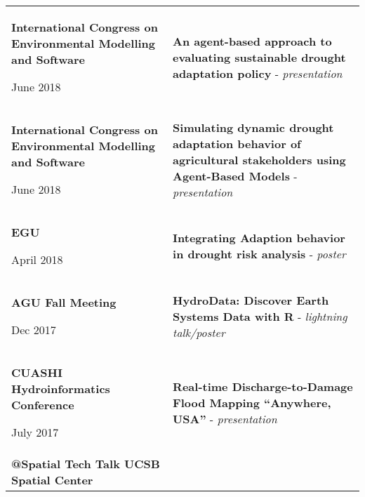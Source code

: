 \begin{longtable}[]{@{}ll@{}}

\endhead
\begin{minipage}[t]{0.47\columnwidth}\raggedright
\textbf{International Congress on Environmental Modelling and Software}

June 2018\strut
\end{minipage} & \begin{minipage}[t]{0.47\columnwidth}\raggedright
\textbf{An agent-based approach to evaluating sustainable drought
adaptation policy} - \emph{presentation}\strut
\end{minipage}\tabularnewline
\begin{minipage}[t]{0.47\columnwidth}\raggedright
\textbf{International Congress on Environmental Modelling and Software}

June 2018\strut
\end{minipage} & \begin{minipage}[t]{0.47\columnwidth}\raggedright
\textbf{Simulating dynamic drought adaptation behavior of agricultural
stakeholders using Agent-Based Models} - \emph{presentation}\strut
\end{minipage}\tabularnewline
\begin{minipage}[t]{0.47\columnwidth}\raggedright
\textbf{EGU}

April 2018\strut
\end{minipage} & \begin{minipage}[t]{0.47\columnwidth}\raggedright
\textbf{Integrating Adaption behavior in drought risk analysis} -
\emph{poster}\strut
\end{minipage}\tabularnewline
\begin{minipage}[t]{0.47\columnwidth}\raggedright
\textbf{AGU Fall Meeting}

Dec 2017\strut
\end{minipage} & \begin{minipage}[t]{0.47\columnwidth}\raggedright
\textbf{HydroData: Discover Earth Systems Data with R} - \emph{lightning
talk/poster}\strut
\end{minipage}\tabularnewline
\begin{minipage}[t]{0.47\columnwidth}\raggedright
\textbf{CUASHI Hydroinformatics Conference}

July 2017\strut
\end{minipage} & \begin{minipage}[t]{0.47\columnwidth}\raggedright
\textbf{Real-time Discharge-to-Damage Flood Mapping ``Anywhere, USA''} -
\emph{presentation}\strut
\end{minipage}\tabularnewline
\begin{minipage}[t]{0.47\columnwidth}\raggedright
\textbf{@Spatial Tech Talk UCSB Spatial Center}


\end{minipage}
\end{longtable}
